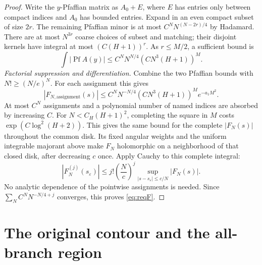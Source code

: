 \documentclass[11pt]{article}
\numberwithin{equation}{section}
\theoremstyle{definition}
\newcommand{\Pf}{\operatorname{Pf}}
\newcommand{\se}{s_\varepsilon}
\begin{document}
\begin{proof}
Write the \(y\)-Pfaffian matrix as \(A_0+E\), where \(E\) has entries
only between compact indices and \(A_0\) has bounded entries.
Expand in an even compact subset of size \(2r\). The remaining
Pfaffian minor is at most \(C^N N^{(N-2r)/4}\) by Hadamard.
There are at most \(N^{3r}\) coarse choices of subset and matching;
their disjoint kernels have integral at most \((C(H+1))^r\).
As \(r\le M/2\), a sufficient bound is
\[
 \int|\Pf A(y)|\le C^N N^{N/4}(CN^3(H+1))^M.
 \]
\smallskip\noindent\textit{Factorial suppression and differentiation.}
Combine the two Pfaffian bounds with \(N!\ge(N/e)^N\). For each assignment this gives
\[
 |F_{N,\mathrm{assignment}}(s)|
 \le C^N N^{-N/4}(CN^3(H+1))^M e^{-a_1M^2}.
 \]
At most \(C^N\) assignments and a polynomial number of named indices
are absorbed by increasing \(C\). For \(N<C_H(H+1)^2\), completing
the square in \(M\) costs \(\exp(C\log^2(H+2))\).
This gives the same bound for the complete \(|F_N(s)|\) throughout
the common disk. Its fixed angular weights and the uniform integrable
majorant above make \(F_N\) holomorphic on a neighborhood of that
closed disk, after decreasing \(c\) once. Apply Cauchy to this complete
integral:
\[
 |F_N^{(j)}(\se)|\le j!\left(\frac Nc\right)^j
       \sup_{|s-\se|\le c/N}|F_N(s)|.
\]
No analytic dependence of the pointwise assignments is needed.
Since \(\sum_N C^N N^{-N/4+j}\) converges, this proves \eqref{eq:reqF}.
\end{proof}



\section{The original contour and the all-branch region}
\label{sec:K}
\end{document}
